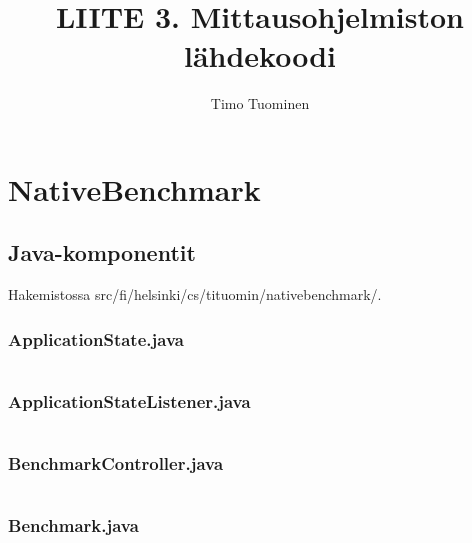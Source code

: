 \documentclass[a4paper,11pt]{article}
\title{LIITE 3. Mittausohjelmiston lähdekoodi}
\date{}
\author{Timo Tuominen}
\begin{document}
\maketitle{}

\renewcommand{\theFancyVerbLine}{
  \sffamily\textcolor[rgb]{0.5,0.5,0.5}{\scriptsize\arabic{FancyVerbLine}}}

\renewcommand*\contentsname{Tiedostot}
\tableofcontents

\newpage
\section{NativeBenchmark}
\subsection{Java-komponentit}
Hakemistossa src/fi/helsinki/cs/tituomin/nativebenchmark/.
\vspace{1cm}
\subsubsection{ApplicationState.java}
\inputminted[fontsize=\footnotesize, linenos, numbersep=5pt, tabsize=4, frame=topline,framesep=0.8cm]{java}{/home/tituomin/StudioProjects/nativebenchmark/src/fi/helsinki/cs/tituomin/nativebenchmark/ApplicationState.java}
\vspace{1cm}
\subsubsection{ApplicationStateListener.java}
\inputminted[fontsize=\footnotesize, linenos, numbersep=5pt, tabsize=4, frame=topline,framesep=0.8cm]{java}{/home/tituomin/StudioProjects/nativebenchmark/src/fi/helsinki/cs/tituomin/nativebenchmark/ApplicationStateListener.java}
\vspace{1cm}
\subsubsection{BenchmarkController.java}
\inputminted[fontsize=\footnotesize, linenos, numbersep=5pt, tabsize=4, frame=topline,framesep=0.8cm]{java}{/home/tituomin/StudioProjects/nativebenchmark/src/fi/helsinki/cs/tituomin/nativebenchmark/BenchmarkController.java}
\vspace{1cm}
\subsubsection{Benchmark.java}
\inputminted[fontsize=\footnotesize, linenos, numbersep=5pt, tabsize=4, frame=topline,framesep=0.8cm]{java}{/home/tituomin/StudioProjects/nativebenchmark/src/fi/helsinki/cs/tituomin/nativebenchmark/Benchmark.java}
\vspace{1cm}
\end{document}
